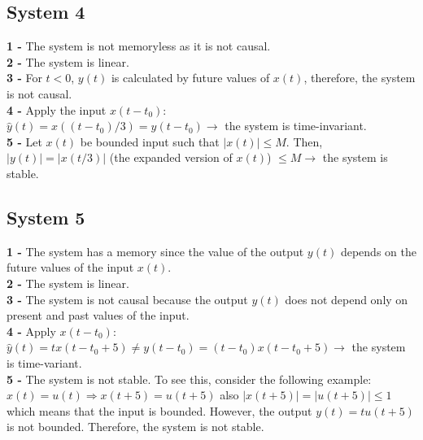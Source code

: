 \documentclass[12pt]{article}
\begin{document}
    \subsection*{System 4}
    \textbf{1 - }The system is not memoryless as it is not causal. \\
    \textbf{2 - }The system is linear.\\
    \textbf{3 - }For \(t < 0\), \(y(t)\) is calculated by future values of \(x(t)\), therefore, the 
    system is not causal.\\
    \textbf{4 - }Apply the input \(x(t-t_0)\):\\
    \(\hat{y}(t) = x((t-t_0) / 3) = y(t-t_0) \longrightarrow \) the system is time-invariant.\\
    \textbf{5 - }Let \(x(t)\) be bounded input such that \(\left\lvert x(t)\right\rvert \leq M\). Then, \(\left\lvert y(t)\right\rvert = \left\lvert x(t/3)\right\rvert \) (the expanded version of \(x(t)\)) \(\leq M \longrightarrow\) the system is stable.\\

    \subsection*{System 5}
    \textbf{1 - }The system has a memory since the value of the output \(y(t)\) depends on
    the future values of the input \(x(t)\). \\
    \textbf{2 - }The system is linear.\\
    \textbf{3 - }The system is not causal because the output \(y(t)\) does not depend only on
    present and past values of the input. \\
    \textbf{4 - }Apply \(x(t-t_0)\):\\
    \(\hat{y}(t) = tx(t-t_0+5) \neq y(t-t_0) = (t-t_0)x(t-t_0+5) \longrightarrow\) the system is time-variant. \\ 
    \textbf{5 - }The system is not stable. To see this, consider the following example: \\
    \(x(t) = u(t) \Rightarrow x(t+5) = u(t+5)\) also 
    \(\left\lvert x(t+5)\right\rvert  = \left\lvert u(t+5)\right\rvert  \leq 1\) 
    which means that the input is bounded. However, the output \(y(t) = tu(t+5)\) is not bounded. Therefore, the system is not stable.\\
\end{document}
